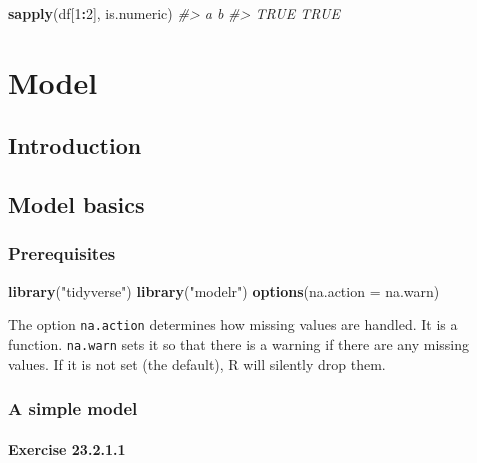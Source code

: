 \documentclass[]{book}
\newenvironment{Shaded}{\begin{snugshade}}{\end{snugshade}}
\newcommand{\CommentTok}[1]{\textcolor[rgb]{0.56,0.35,0.01}{\textit{#1}}}
\newcommand{\DataTypeTok}[1]{\textcolor[rgb]{0.13,0.29,0.53}{#1}}
\newcommand{\DecValTok}[1]{\textcolor[rgb]{0.00,0.00,0.81}{#1}}
\newcommand{\KeywordTok}[1]{\textcolor[rgb]{0.13,0.29,0.53}{\textbf{#1}}}
\newcommand{\NormalTok}[1]{#1}
\newcommand{\OperatorTok}[1]{\textcolor[rgb]{0.81,0.36,0.00}{\textbf{#1}}}
\newcommand{\StringTok}[1]{\textcolor[rgb]{0.31,0.60,0.02}{#1}}
\theoremstyle{plain}
\theoremstyle{remark}
\begin{document}
\begin{Shaded}
\begin{Highlighting}[]
\KeywordTok{sapply}\NormalTok{(df[}\DecValTok{1}\OperatorTok{:}\DecValTok{2}\NormalTok{], is.numeric)}
\CommentTok{#>    a    b }
\CommentTok{#> TRUE TRUE}
\end{Highlighting}
\end{Shaded}

\hypertarget{part-model}{%
\part{Model}\label{part-model}}

\hypertarget{model-intro}{%
\chapter{Introduction}\label{model-intro}}

\hypertarget{model-basics}{%
\chapter{Model basics}\label{model-basics}}

\hypertarget{prerequisites-1}{%
\section{Prerequisites}\label{prerequisites-1}}

\begin{Shaded}
\begin{Highlighting}[]
\KeywordTok{library}\NormalTok{(}\StringTok{"tidyverse"}\NormalTok{)}
\KeywordTok{library}\NormalTok{(}\StringTok{"modelr"}\NormalTok{)}
\KeywordTok{options}\NormalTok{(}\DataTypeTok{na.action =}\NormalTok{ na.warn)}
\end{Highlighting}
\end{Shaded}

The option \texttt{na.action} determines how missing values are handled.
It is a function. \texttt{na.warn} sets it so that there is a warning if
there are any missing values. If it is not set (the default), R will
silently drop them.

\hypertarget{a-simple-model}{%
\section{A simple model}\label{a-simple-model}}

\hypertarget{exercise-23.2.1.1}{%
\subsection*{\texorpdfstring{Exercise
{23.2.1.1}}{Exercise 23.2.1.1}}\label{exercise-23.2.1.1}}
\end{document}
